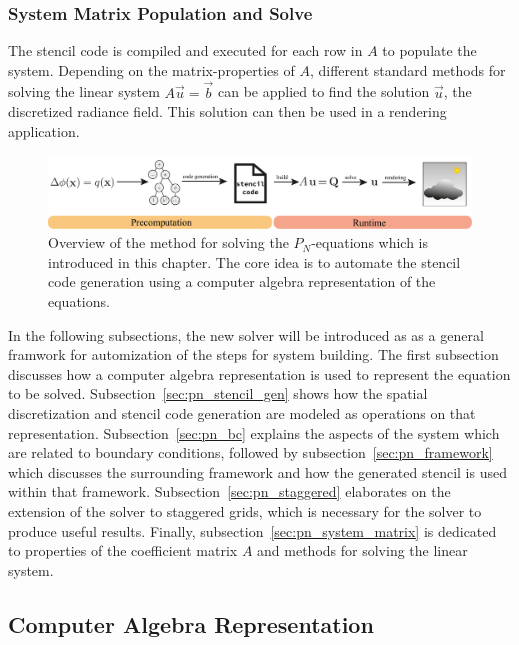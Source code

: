 \subsubsection*{System Matrix Population and Solve}
The stencil code is compiled and executed for each row in $A$ to populate the system. Depending on the matrix-properties of $A$, different standard methods for solving the linear system $A\vec{u}=\vec{b}$ can be applied to find the solution $\vec{u}$, the discretized radiance field. This solution can then be used in a rendering application.
\begin{figure}[h]
\centering
\includegraphics[width=1.0\textwidth]{04_pn_method/figures/fig_pipeline.pdf}
\caption{Overview of the method for solving the $P_N$-equations which is introduced in this chapter. The core idea is to automate the stencil code generation using a computer algebra representation of the equations.}
\label{fig:pn_solver_stencil_overview}
\end{figure}

In the following subsections, the new solver will be introduced as as a general framwork for automization of the steps for system building. The first subsection discusses how a computer algebra representation is used to represent the equation to be solved. Subsection~\ref{sec:pn_stencil_gen} shows how the spatial discretization and stencil code generation are modeled as operations on that representation. Subsection~\ref{sec:pn_bc} explains the aspects of the system which are related to boundary conditions, followed by subsection~\ref{sec:pn_framework} which discusses the surrounding framework and how the generated stencil is used within that framework. Subsection~\ref{sec:pn_staggered} elaborates on the extension of the solver to staggered grids, which is necessary for the solver to produce useful results. Finally, subsection~\ref{sec:pn_system_matrix} is dedicated to properties of the coefficient matrix $A$ and methods for solving the linear system.

\subsection{Computer Algebra Representation}
\label{sec:pn_car}

